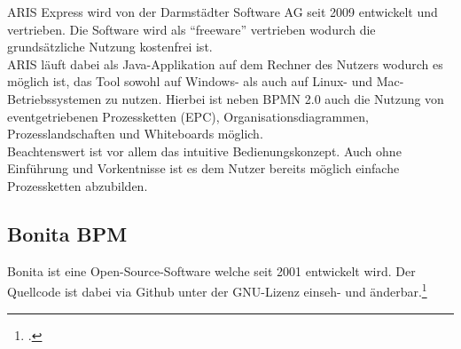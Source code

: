 ARIS Express wird von der Darmstädter Software AG seit 2009 entwickelt und
vertrieben. Die Software wird als "`freeware"' vertrieben wodurch die
grundsätzliche Nutzung kostenfrei ist.
\\

ARIS läuft dabei als Java-Applikation
auf dem Rechner des Nutzers wodurch es möglich ist, das Tool sowohl auf Windows-
als auch auf Linux- und Mac-Betriebssystemen zu nutzen.
Hierbei ist neben BPMN 2.0 auch die Nutzung von eventgetriebenen
Prozessketten (EPC), Organisationsdiagrammen,
Prozesslandschaften und Whiteboards möglich.\\

Beachtenswert ist vor allem das intuitive Bedienungskonzept.
Auch ohne Einführung und Vorkentnisse ist es dem Nutzer bereits möglich einfache
Prozessketten abzubilden.





\subsection{Bonita BPM}

Bonita ist eine Open-Source-Software welche seit 2001 entwickelt wird. Der
Quellcode ist dabei via Github unter der GNU-Lizenz einseh- und
änderbar.\footcite{bonitasource}

\begin{figure}[H]
\begin{minipage}{\linewidth}
\begin{center}
\end{center}
\end{minipage}
\end{figure}

